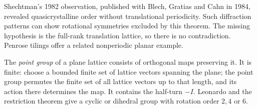 \begin{remark}
Shechtman's 1982 observation, published with Blech, Gratias and Cahn in 1984, revealed quasicrystalline order without translational periodicity. Such diffraction patterns can show rotational symmetries excluded by this theorem. The missing hypothesis is the full-rank translation lattice, so there is no contradiction. Penrose tilings offer a related nonperiodic planar example.
\end{remark}

The \emph{point group} of a plane lattice consists of orthogonal maps preserving it. It is finite: choose a bounded finite set of lattice vectors spanning the plane; the point group permutes the finite set of all lattice vectors up to that length, and its action there determines the map. It contains the half-turn $-I$. Leonardo and the restriction theorem give a cyclic or dihedral group with rotation order $2,4$ or $6$.

